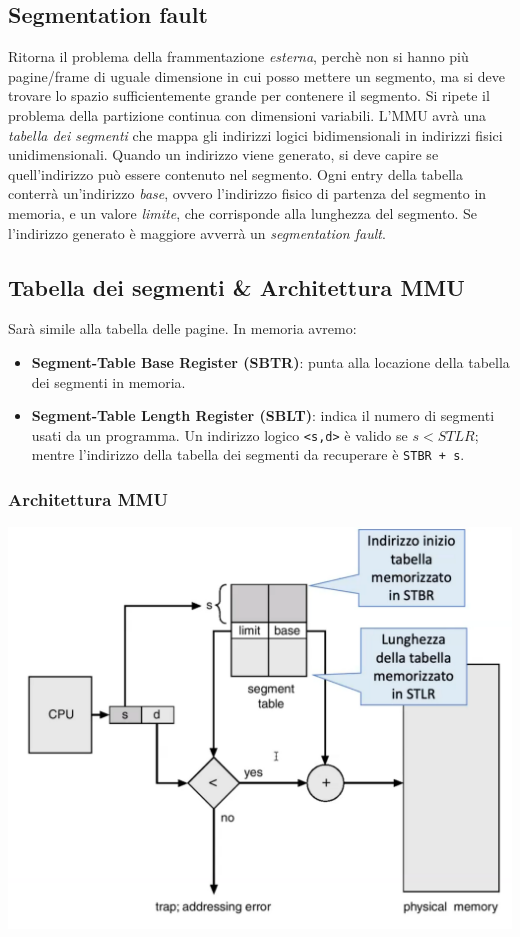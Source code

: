 \documentclass[a4paper,12pt, twoside]{report}
\newcommand{\defbox}[1]{\noindent\colorbox{shadecolor}
{\parbox{\dimexpr\textwidth-2\fboxsep\relax}{#1}}}
\begin{document}
\subsection{Segmentation fault}
Ritorna il problema della frammentazione \emph{esterna}, perch\`e non si hanno pi\`u pagine/frame di 
uguale dimensione in cui posso mettere un segmento, ma si deve trovare lo spazio sufficientemente 
grande per contenere il segmento. Si ripete il problema della partizione continua con dimensioni 
variabili. 
L'MMU avr\`a una \emph{tabella dei segmenti} che mappa gli indirizzi logici bidimensionali in 
indirizzi fisici unidimensionali. Quando un indirizzo viene generato, si deve capire se 
quell'indirizzo pu\`o essere contenuto nel segmento. Ogni entry della tabella conterr\`a un'indirizzo 
\emph{base}, ovvero l'indirizzo fisico di partenza del segmento in memoria, e un valore \emph{limite},
che corrisponde alla lunghezza del segmento. Se l'indirizzo generato \`e maggiore avverr\`a un 
\emph{segmentation fault}.

\subsection{Tabella dei segmenti \& Architettura MMU} 
Sar\`a simile alla tabella delle pagine. In memoria avremo:
\begin{itemize}
    \item \defbox{\textbf{Segment-Table Base Register (SBTR)}: punta alla locazione della tabella dei 
        segmenti in memoria.}
    \item \defbox{\textbf{Segment-Table Length Register (SBLT)}: indica il numero di segmenti usati da
        un programma. Un indirizzo logico \texttt{<s,d>} \`e valido se $s < STLR$; mentre l'indirizzo 
        della tabella dei segmenti da recuperare \`e \texttt{STBR + s}.}
\end{itemize} 

\subsubsection{Architettura MMU}
\begin{center}
    \includegraphics[scale=0.16]{mmu_seg}
\end{center} 
\end{document}

